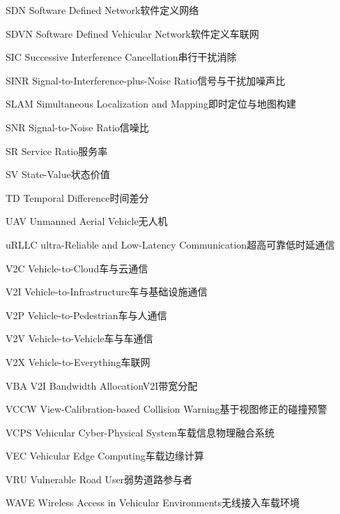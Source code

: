 \begin{abbreviate}[0mm][18mm]
\item[SDN] Software Defined Network\hspace{1em}软件定义网络
\item[SDVN] Software Defined Vehicular Network\hspace{1em}软件定义车联网
\item[SIC] Successive Interference Cancellation\hspace{1em}串行干扰消除
\item[SINR] Signal-to-Interference-plus-Noise Ratio\hspace{1em}信号与干扰加噪声比
\item[SLAM] Simultaneous Localization and Mapping\hspace{1em}即时定位与地图构建
\item[SNR] Signal-to-Noise Ratio\hspace{1em}信噪比
\item[SR] Service Ratio\hspace{1em}服务率
\item[SV] State-Value\hspace{1em}状态价值
\item[TD] Temporal Difference\hspace{1em}时间差分
\item[UAV] Unmanned Aerial Vehicle\hspace{1em}无人机
\item[uRLLC] ultra-Reliable and Low-Latency Communication\hspace{1em}超高可靠低时延通信
\item[V2C] Vehicle-to-Cloud\hspace{1em}车与云通信
\item[V2I] Vehicle-to-Infrastructure\hspace{1em}车与基础设施通信
\item[V2P] Vehicle-to-Pedestrian\hspace{1em}车与人通信
\item[V2V] Vehicle-to-Vehicle\hspace{1em}车与车通信
\item[V2X] Vehicle-to-Everything\hspace{1em}车联网
\item[VBA] V2I Bandwidth Allocation\hspace{1em}V2I带宽分配
\item[VCCW] View-Calibration-based Collision Warning\hspace{1em}基于视图修正的碰撞预警
\item[VCPS] Vehicular Cyber-Physical System\hspace{1em}车载信息物理融合系统
\item[VEC] Vehicular Edge Computing\hspace{1em}车载边缘计算
\item[VRU] Vulnerable Road User\hspace{1em}弱势道路参与者
\item[WAVE] Wireless Access in Vehicular Environments\hspace{1em}无线接入车载环境
\end{abbreviate}
\endinput